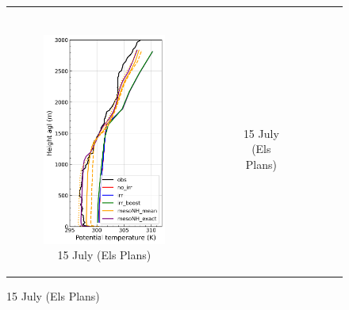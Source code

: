 \begin{figure}[hbtp]
{\begin{tabular}{@{}cccc@{}}
\begin{subfigure}[t]{0.29\textwidth}
        \end{subfigure} \\
        \begin{subfigure}[t]{0.382\textwidth}
            \caption{15 July (Els Plans)}
            \includegraphics[width=\textwidth]{images/chap5/profiles/profile_elsplans_theta_1507_sensbins.png}
        \end{subfigure} &
        \begin{subfigure}[t]{0.29\textwidth}
            \caption{15 July (Els Plans)}

\end{subfigure}
\end{tabular}}
\end{figure}
